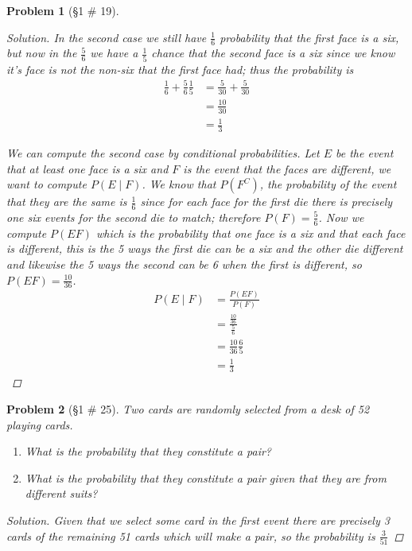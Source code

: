\documentclass[11pt, oneside]{book}   	%
\newtheorem{problem}{Problem}[chapter]
\begin{document}
\begin{spacing}{1.618}
\begin{problem}[\S 1 \# 19]
\begin{proof}[Solution]
		In the second case we still have $\frac{1}{6}$ probability that the first face is a six, but now in the $\frac{5}{6}$ we have a $\frac{1}{5}$ chance that the second face is a six since we know it's face is not the non-six that the first face had; thus the probability is
		\begin{alignat*}{4}
			\frac{1}{6}+\frac{5}{6}\frac{1}{5}&= \frac{5}{30}+\frac{5}{30} \\
				&=\frac{10}{30} \\
				&=\frac{1}{3}
		\end{alignat*}
		
		We can compute the second case by conditional probabilities. Let $E$ be the event that at least one face is a six and $F$ is the event that the faces are different, we want to compute $P(E\mid F)$. We know that $P\left(F^C\right)$, the probability of the event that they are the same is $\frac{1}{6}$ since for each face for the first die there is precisely one six events for the second die to match; therefore $P(F)=\frac{5}{6}$. Now we compute $P(EF)$ which is the probability that one face is a six and that each face is different, this is the 5 ways the first die can be a six and the other die different and likewise the 5 ways the second can be 6 when the first is different, so $P(EF)=\frac{10}{36}$.
		\begin{alignat*}{4}
			P(E\mid F)&=\frac{P(EF)}{P(F)} \\
				&=\frac{\frac{10}{36}}{\frac{5}{6}} \\
				&=\frac{10}{36}\frac{6}{5} \\
				&=\frac{1}{3}
		\end{alignat*} 
	\end{proof}
\end{problem}

\begin{problem}[\S 1 \# 25]
	Two cards are randomly selected from a desk of 52 playing cards. 
	\begin{enumerate}
		\item What is the probability that they constitute a pair? 
		\item What is the probability that they constitute a pair given that they are from different suits? 
	\end{enumerate}
	\begin{proof}[Solution]
		Given that we select some card in the first event there are precisely 3 cards of the remaining 51 cards which will make a pair, so the probability is $\frac{3}{51}$
		

\end{proof}
\end{problem}
\end{spacing}
\end{document}
